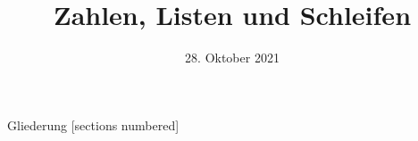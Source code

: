 



\title{Zahlen, Listen und Schleifen}
\date{28. Oktober 2021}

\usepackage{graphicx}


	
\maketitle

\begin{frame}{Gliederung}
	[sections numbered]
	\tableofcontents
\end{frame}



